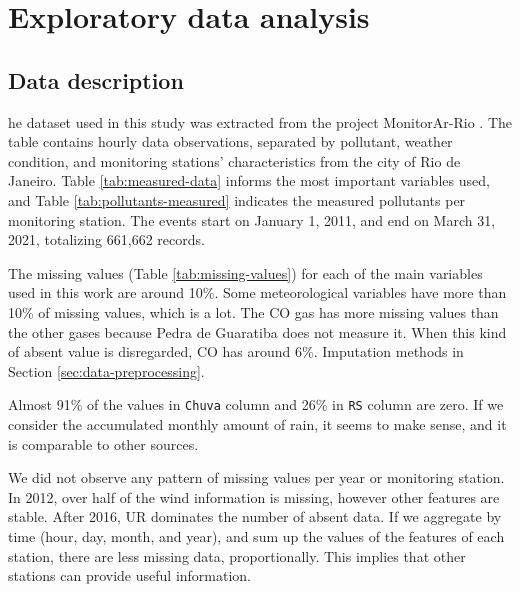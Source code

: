\section{Exploratory data analysis}
\label{sec:eda}

\subsection{Data description}

he dataset used in this study was extracted from the project MonitorAr-Rio
\cite{dataset-rio-ar-quality}. The table contains hourly data observations, separated by
pollutant, weather condition, and monitoring stations' characteristics from
the city of Rio de Janeiro. Table
\ref{tab:measured-data} informs the most important variables used, and Table
\ref{tab:pollutants-measured} indicates the measured pollutants per monitoring
station. The events start on January 1,
2011,
and end on March 31, 2021, totalizing 661,662 records.

The missing values (Table \ref{tab:missing-values}) for each of the main variables used in this work 
are around 10\%. Some meteorological variables have more than 10\% of missing values, which is a lot.
The CO gas has more missing values than the other gases because Pedra de
Guaratiba does not measure it. When this kind of absent value is disregarded,
CO has around 6\%. Imputation methods in Section \ref{sec:data-preprocessing}.

Almost 91\% of the values in {\tt Chuva} column and 26\% in {\tt RS} column are zero. If we consider the accumulated monthly amount of
rain, it seems to make sense, and it is comparable to other sources. 

We did not observe any pattern of missing values per year or monitoring
station. In 2012, over half of the wind information is missing, however other
features are stable. After 2016, UR dominates the number of absent
data. If we aggregate by time (hour, day, month, and year), and sum up the
values of the features of each station, there are less missing data,
proportionally. This
implies that other stations can provide useful information. 

